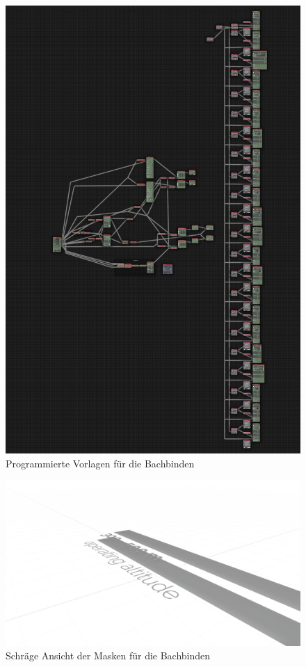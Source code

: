 \begin{figure}[H]
\begin{center}
\includegraphics[width=\textwidth]{gfx/post/call-out.jpg}
\caption{Programmierte Vorlagen für die Bachbinden}
\label{out}
\end{center}
\end{figure}

\begin{figure}[H]
\begin{center}
\includegraphics[width=\textwidth]{gfx/post/call-out2.jpg}
\caption{Schräge Ansicht der Masken für die Bachbinden}
\label{out2}
\end{center}
\end{figure}

